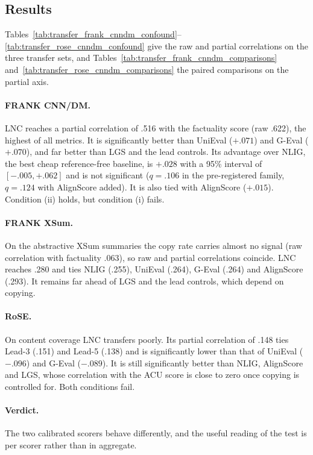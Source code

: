 \subsection{Results}

Tables~\ref{tab:transfer_frank_cnndm_confound}--\ref{tab:transfer_rose_cnndm_confound} give the raw and partial correlations on the three transfer sets, and Tables~\ref{tab:transfer_frank_cnndm_comparisons} and~\ref{tab:transfer_rose_cnndm_comparisons} the paired comparisons on the partial axis.

\paragraph{FRANK CNN/DM.} LNC reaches a partial correlation of .516 with the factuality score (raw .622), the highest of all metrics. It is significantly better than UniEval ($+.071$) and G-Eval ($+.070$), and far better than LGS and the lead controls. Its advantage over NLIG, the best cheap reference-free baseline, is $+.028$ with a 95\% interval of $[-.005, +.062]$ and is not significant ($q=.106$ in the pre-registered family, $q=.124$ with AlignScore added). It is also tied with AlignScore ($+.015$). Condition (ii) holds, but condition (i) fails.

\paragraph{FRANK XSum.} On the abstractive XSum summaries the copy rate carries almost no signal (raw correlation with factuality .063), so raw and partial correlations coincide. LNC reaches .280 and ties NLIG (.255), UniEval (.264), G-Eval (.264) and AlignScore (.293). It remains far ahead of LGS and the lead controls, which depend on copying.

\paragraph{RoSE.} On content coverage LNC transfers poorly. Its partial correlation of .148 ties Lead-3 (.151) and Lead-5 (.138) and is significantly lower than that of UniEval ($-.096$) and G-Eval ($-.089$). It is still significantly better than NLIG, AlignScore and LGS, whose correlation with the ACU score is close to zero once copying is controlled for. Both conditions fail.

\paragraph{Verdict.} The two calibrated scorers behave differently, and the useful reading of the test is per scorer rather than in aggregate.

